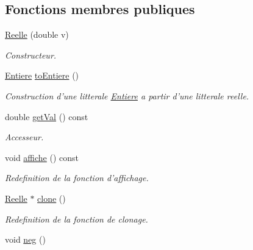 \subsection*{Fonctions membres publiques}
\begin{CompactItemize}
\item 
\hyperlink{class_reelle_6fdee6f1628064efbfe4bdcd31a8cfc4}{Reelle} (double v)
\begin{CompactList}\small\item\em Constructeur. \item\end{CompactList}\item 
\hyperlink{class_entiere}{Entiere} \hyperlink{class_reelle_9a9cb01d74565fa4e702044ffc3fceb7}{toEntiere} ()
\begin{CompactList}\small\item\em Construction d'une litterale \hyperlink{class_entiere}{Entiere} a partir d'une litterale reelle. \item\end{CompactList}\item 
double \hyperlink{class_reelle_5ebbb4a65a1143c736b8545fc67af281}{getVal} () const 
\begin{CompactList}\small\item\em Accesseur. \item\end{CompactList}\item 
\hypertarget{class_reelle_df93b60f8c72687b412e7589a2be114c}{
void \hyperlink{class_reelle_df93b60f8c72687b412e7589a2be114c}{affiche} () const }
\label{class_reelle_df93b60f8c72687b412e7589a2be114c}

\begin{CompactList}\small\item\em Redefinition de la fonction d'affichage. \item\end{CompactList}\item 
\hypertarget{class_reelle_3141e2961030350942c10de764c13180}{
\hyperlink{class_reelle}{Reelle} $\ast$ \hyperlink{class_reelle_3141e2961030350942c10de764c13180}{clone} ()}
\label{class_reelle_3141e2961030350942c10de764c13180}

\begin{CompactList}\small\item\em Redefinition de la fonction de clonage. \item\end{CompactList}\item 
\hypertarget{class_reelle_a3b7da9b29f96a45b2064f7918d014c3}{
void \hyperlink{class_reelle_a3b7da9b29f96a45b2064f7918d014c3}{neg} ()}
\label{class_reelle_a3b7da9b29f96a45b2064f7918d014c3}


\end{CompactItemize}
